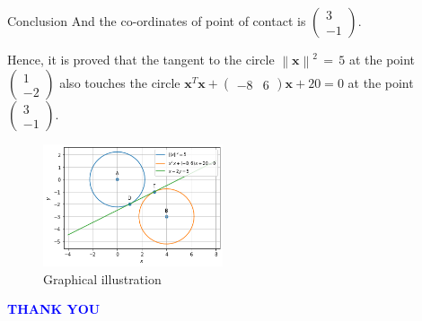 \documentclass{beamer}
\newcommand\norm[1]{\left\lVert#1\right\rVert}
\renewcommand{\vec}[1]{\mathbf{#1}}
\theoremstyle{remark}
\providecommand{\norm}[1]{\lVert#1\rVert}
\newcommand{\myvec}[1]{\ensuremath{\begin{pmatrix}#1\end{pmatrix}}}
\numberwithin{equation}{subsection}
\let\vec\mathbf
\begin{document}
\begin{frame}{Conclusion}
    And the co-ordinates of point of contact is $\myvec{3\\-1}$.
    
Hence, it is proved that the tangent to the circle $\norm{\vec{x}}^2\,=\,5$ at the point \myvec{1\\-2} also touches the circle $  \vec{x}^T\vec{x}+\myvec{-8 & 6}\vec{x}+20 = 0$ at the point $\myvec{3\\-1}$.
\begin{figure}[htp]
    \centering
    \includegraphics[width=53mm]{a_3.png}
    \caption{Graphical illustration}
    \label{fig:my_label}
\end{figure}
\end{frame}


\begin{frame}
   \centering
    \textcolor{blue}{\Huge{\textbf{THANK YOU}}}
\end{frame}
\end{document}
